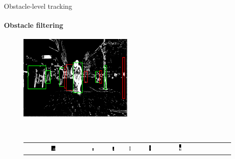 \begin{frame}{Obstacle-level tracking}
  \framesubtitle{Obstacle filtering}

  \begin{figure}
    \begin{minipage}{\textwidth}
      \centering
      \includegraphics[width=0.5\textwidth]{thresholdedPolar}
      \end{minipage}\hfill~
    \begin{minipage}{\textwidth}
      \centering
      \begin{tabular}{ |c|c|c|c|c|c|c|c|c|c|c|}
	\hline
	\includegraphics[width=0.075\textwidth, height=0.075\textwidth]{obstacleFilter/roi0} &
	\includegraphics[width=0.075\textwidth, height=0.075\textwidth]{obstacleFilter/roi1} &
	\includegraphics[width=0.075\textwidth, height=0.075\textwidth]{obstacleFilter/roi2} &
	\includegraphics[width=0.075\textwidth, height=0.075\textwidth]{obstacleFilter/roi3} &
	\includegraphics[width=0.075\textwidth, height=0.075\textwidth]{obstacleFilter/roi4} & 
	\includegraphics[width=0.075\textwidth, height=0.075\textwidth]{obstacleFilter/roi5} &

\end{tabular}
\end{minipage}
\end{figure}
\end{frame}
